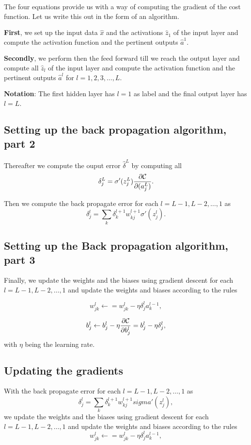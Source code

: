 \documentclass[%
oneside,                 %
final,                   %
10pt]{article}
\begin{document}
The four equations  provide us with a way of computing the gradient of the cost function. Let us write this out in the form of an algorithm.

\textbf{First}, we set up the input data $\hat{x}$ and the activations
$\hat{z}_1$ of the input layer and compute the activation function and
the pertinent outputs $\hat{a}^1$.

\textbf{Secondly}, we perform then the feed forward till we reach the output
layer and compute all $\hat{z}_l$ of the input layer and compute the
activation function and the pertinent outputs $\hat{a}^l$ for
$l=1,2,3,\dots,L$.

\textbf{Notation}: The first hidden layer has $l=1$ as label and the final output layer has $l=L$.

\subsection{Setting up the back propagation algorithm, part 2}

Thereafter we compute the ouput error $\hat{\delta}^L$ by computing all
\[
\delta_j^L = \sigma'(z_j^L)\frac{\partial {\cal C}}{\partial (a_j^L)}.
\]

Then we compute the back propagate error for each $l=L-1,L-2,\dots,1$ as
\[
\delta_j^l = \sum_k \delta_k^{l+1}w_{kj}^{l+1}\sigma'(z_j^l).
\]

\subsection{Setting up the Back propagation algorithm, part 3}

Finally, we update the weights and the biases using gradient descent
for each $l=L-1,L-2,\dots,1$ and update the weights and biases
according to the rules

\[
w_{jk}^l\leftarrow  = w_{jk}^l- \eta \delta_j^la_k^{l-1},
\]

\[
b_j^l \leftarrow b_j^l-\eta \frac{\partial {\cal C}}{\partial b_j^l}=b_j^l-\eta \delta_j^l,
\]
with $\eta$ being the learning rate.

\subsection{Updating the gradients}

With the back propagate error for each $l=L-1,L-2,\dots,1$ as
\[
\delta_j^l = \sum_k \delta_k^{l+1}w_{kj}^{l+1}sigma'(z_j^l),
\]
we update the weights and the biases using gradient descent for each $l=L-1,L-2,\dots,1$ and update the weights and biases according to the rules
\[
w_{jk}^l\leftarrow  = w_{jk}^l- \eta \delta_j^la_k^{l-1},
\]
\end{document}
